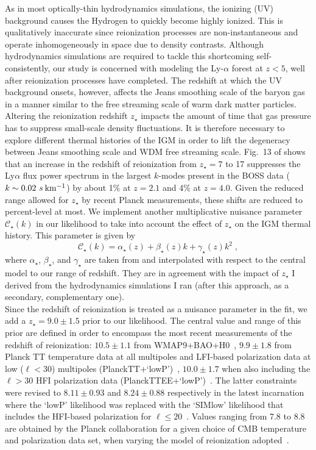 As in most optically-thin hydrodynamics simulations, the ionizing (UV) background causes the Hydrogen to quickly become highly ionized. This is qualitatively inaccurate since reionization processes are non-instantaneous and operate inhomogeneously in space due to density contrasts. Although hydrodynamics simulations are required to tackle this shortcoming self-consistently, our study is concerned with modeling the Ly-$\alpha$ forest at $z<5$, well after reionization processes have completed. The redshift at which the UV background onsets, however, affects the Jeans smoothing scale of the baryon gas \citep{Gnedin&Hui98} in a manner similar to the free streaming scale of warm dark matter particles. Altering the reionization redshift $z_{\star}$ impacts the amount of time that gas pressure has to suppress small-scale density fluctuations. It is therefore necessary to explore different thermal histories of the IGM in order to lift the degeneracy between Jeans smoothing scale and WDM free streaming scale. 
Fig.~13 of \citep{McDonald2005} shows that an increase in the redshift of reionization from $z_{\star}=7$ to 17 suppresses the Ly$\alpha$ flux power spectrum in the largest  $k$-modes present in the BOSS data ($k \sim 0.02~s \: \rm{km^{-1}}$) by about 1\% at $z=2.1$ and 4\% at $z=4.0$. Given the reduced range allowed for $z_{\star}$ by recent Planck measurements, these shifts are reduced to percent-level at most. We implement another multiplicative nuisance parameter $\mathcal{C}_\star(k)$ in our likelihood to take into account the effect of $z_{\star}$ on the IGM thermal history. This parameter is given by 
\begin{equation}
\mathcal{C}_\star(k) = \alpha_\star(z) + \beta_\star(z) k+\gamma_\star(z) k^2 \;,
\end{equation}
where $\alpha_\star$, $\beta_\star$, and $\gamma_\star$ are taken from \citep{McDonald2005} and 
interpolated with respect to the central model to our range of  redshift. They are in agreement with the impact of $z_\star$ I derived from the hydrodynamics simulations I ran (after this approach, as a secondary, complementary one).\\

Since the redshift of reionization is  treated as a nuisance parameter in the fit,  we add a $z_{\star} = 9.0 \pm 1.5$ prior  to our likelihood. The central value and range of this prior are defined in order to encompass the most recent measurements of the redshift of reionization: $10.5\pm 1.1$ from WMAP9+BAO+H0~\cite{WMAP9}, $9.9\pm 1.8$ from  Planck TT temperature data at all multipoles and LFI-based polarization data at low ($\ell<30$) multipoles (PlanckTT+`lowP')~\cite{Planck2015}, $10.0\pm 1.7$ when also including the $\ell>30$ HFI polarization data  (PlanckTTEE+`lowP')~\cite{Planck2015}. The latter constraints were revised to $8.11\pm 0.93$ and $8.24\pm0.88$ respectively in the latest incarnation where the `lowP' likelihood was replaced with the `SIMlow' likelihood that includes the HFI-based polarization for $\ell\leq 20$~\cite{Planck2016PolarReio}. Values ranging from 7.8 to 8.8 are  obtained by the Planck collaboration for a given choice of CMB temperature and polarization data set, when varying the model of reionization adopted~\cite{Planck2016Reio}.


